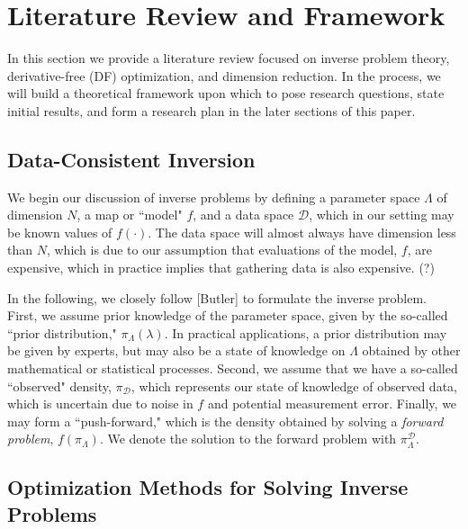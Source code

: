 \documentclass{amsart}
\begin{document}
\newpage
\section{Literature Review and Framework}

In this section we provide a literature review focused on inverse problem theory, derivative-free (DF) optimization, and dimension reduction. In the process, we will build a theoretical framework upon which to pose research questions, state initial results, and form a research plan in the later sections of this paper.


\subsection{Data-Consistent Inversion}

\vspace{.125cm}

We begin our discussion of inverse problems by defining a parameter space $\Lambda$ of dimension $N$, a map or ``model" $f$, and a data space $\mathcal{D}$, which in our setting may be known values of $f(\cdot)$. The data space will almost always have dimension less than $N$, which is due to our assumption that evaluations of the model, $f$, are expensive, which in practice implies that gathering data is also expensive. (?) 

\noindent In the following, we closely follow [Butler] to formulate the inverse problem. First, we assume prior knowledge of the parameter space, given by the so-called ``prior distribution," $\pi_\Lambda(\lambda)$. In practical applications, a prior distribution may be given by experts, but may also be a state of knowledge on $\Lambda$ obtained by other mathematical or statistical processes. Second, we assume that we have a so-called ``observed" density, $\pi_\mathcal{D}$, which represents our state of knowledge of observed data, which is uncertain due to noise in $f$ and potential measurement error. Finally, we may form a ``push-forward," which is the density obtained by solving a \textit{forward problem}, $f\left(\pi_\Lambda \right)$. We denote the solution to the forward problem with $\pi_\Lambda^\mathcal{D}$.

\subsection{Optimization Methods for Solving Inverse Problems}
\end{document}
